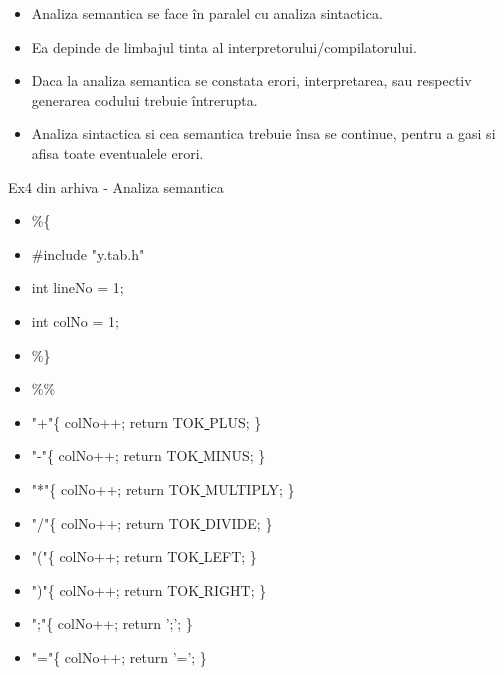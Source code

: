 \documentclass[pdf]{beamer}
\begin{document}
\begin{frame}
\begin{itemize}
\frametitle{Analiza semantica}
\item
Analiza semantica se face în paralel cu analiza sintactica.
\item
Ea depinde de limbajul tinta al interpretorului/compilatorului.
\item
Daca la analiza semantica se constata erori, interpretarea, sau respectiv generarea codului trebuie întrerupta.
\item
Analiza sintactica si cea semantica trebuie însa se continue, pentru a gasi si afisa toate eventualele erori.
\end{itemize}
\end{frame}



\begin{frame}{Ex4 din arhiva - Analiza semantica}
\begin{itemize}
\item
\%\{
\item \qquad
\#include "y.tab.h"
\item \qquad
int lineNo = 1;
\item \qquad
int colNo = 1;
\item
\%\}
\item \vspace{5mm}
\%\%
\item
"+"\hspace{20mm}\{ colNo++; return TOK\underline{ }PLUS; \}
\item
"-"\hspace{21.7mm}\{ colNo++; return TOK\underline{ }MINUS; \}
\item
"*"\hspace{21mm}\{ colNo++; return TOK\underline{ }MULTIPLY; \}
\item
"/"\hspace{21mm}\{ colNo++; return TOK\underline{ }DIVIDE; \}
\item
"("\hspace{21.5mm}\{ colNo++; return TOK\underline{ }LEFT; \}
\item
")"\hspace{21.5mm}\{ colNo++; return TOK\underline{ }RIGHT; \}
\item
";"\hspace{22mm}\{ colNo++; return ';'; \}
\item
"="\hspace{20mm}\{ colNo++; return '='; \}
\end{itemize}
\end{frame}
\end{document}
